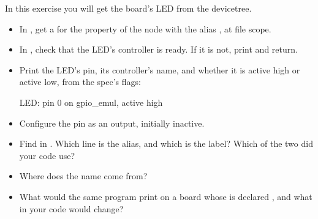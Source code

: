 \label{c2:ex:1.1}
In this exercise you will get the board’s LED from the devicetree.

\begin{itemize}
  \item In , get a  for the  property of the node with
    the alias , at file scope.
  \item In , check that the LED’s controller is ready. If it is not, print  and return.
  \item Print the LED’s pin, its controller’s name, and whether it is active high or active low, from the
    spec’s flags:
\begin{console}
LED: pin 0 on gpio_emul, active high
\end{console}
  \item Configure the pin as an output, initially inactive.
\end{itemize}

\begin{itemize}
  \item Find  in . Which line is the
    alias, and which is the label? Which of the two did your code use?
  \item Where does the name  come from?
  \item What would the same program print on a board whose  is declared
, and what in your code would change?
\end{itemize}

\label{c2:ex:1.2}

